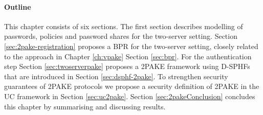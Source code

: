 %

\paragraph{Outline}
This chapter consists of six sections.
The first section describes modelling of passwords, policies and password shares for the two-server setting.
Section \ref{sec:2pake-registration} proposes a \acl{BPR} for the two-server setting, closely related to the approach in Chapter \ref{ch:vpake} Section \ref{sec:bpr}.
For the authentication step Section \ref{sec:twoserverpake} proposes a \ac{2PAKE} framework using \acp{D-SPHF} that are introduced in Section \ref{sec:dsphf-2pake}.
To strengthen security guarantees of \ac{2PAKE} protocols we propose a security definition of \ac{2PAKE} in the \ac{UC} framework in Section \ref{sec:uc2pake}.
Section \ref{sec:2pakeConclusion} concludes this chapter by summarising and discussing results.

